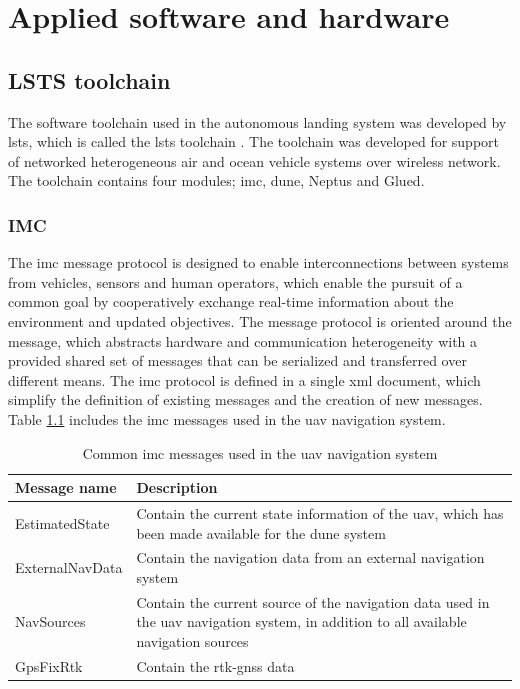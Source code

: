\chapter{Applied software and hardware}
\section{LSTS toolchain}
The software toolchain used in the autonomous landing system was developed by \gls{lsts}, which is called the \gls{lsts} toolchain \citep{pinto2013lsts}. The toolchain was developed for support of networked heterogeneous air and ocean vehicle systems over wireless network. The toolchain contains four modules; \gls{imc}, \gls{dune}, Neptus and Glued.
\subsection{IMC}
The \acrfull{imc} message protocol \citep{martins2009imc} is designed to enable interconnections between systems from vehicles, sensors and human operators, which enable the pursuit of a common goal by cooperatively exchange real-time information about the environment and updated objectives. The message protocol is oriented around the message, which abstracts hardware and communication heterogeneity with a provided shared set of messages that can be serialized and transferred over different means. The \gls{imc} protocol is defined in a single \gls{xml} document, which simplify the definition of existing messages and the creation of new messages. Table \ref{Tb:IMCmessages} includes the \gls{imc} messages used in the \gls{uav} navigation system.
\newpage
\begin{table}[H]
\centering
\begin{tabular}{| p{2.5cm} | p{9cm} |}
\hline
\textbf{Message name} & \textbf{Description} \\ \hline
EstimatedState	& Contain the current state information of the \gls{uav}, which has been made available for the \gls{dune} system	\\ \hline
ExternalNavData & Contain the navigation data from an external navigation system	\\ \hline
NavSources		& Contain the current source of the navigation data used in the \gls{uav} navigation system, in addition to all available navigation sources\\ \hline
GpsFixRtk		& Contain the \gls{rtk-gnss} data \\ \hline
\end{tabular}
\caption{Common \gls{imc} messages used in the \gls{uav} navigation system}
\label{Tb:IMCmessages}
\end{table}
